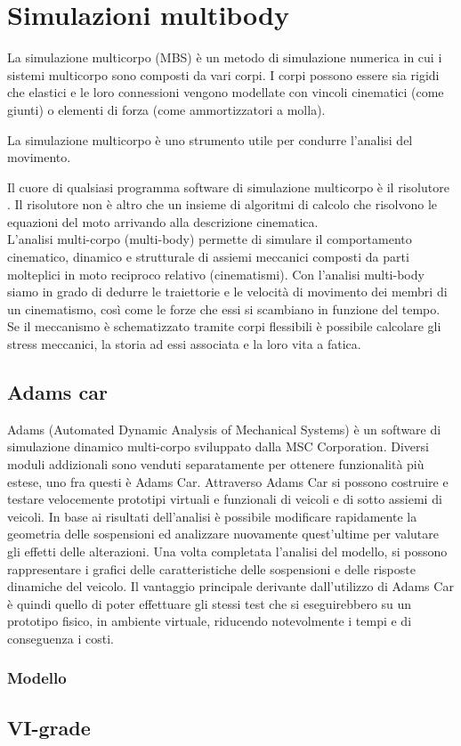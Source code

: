 \chapter{Simulazioni multibody}
\label{cha:cap5}
La simulazione multicorpo (MBS) è un metodo di simulazione numerica in cui i sistemi multicorpo sono composti da vari corpi. I corpi possono essere sia rigidi che elastici e le loro connessioni vengono modellate con vincoli cinematici (come giunti) o elementi di forza (come ammortizzatori a molla).

La simulazione multicorpo è uno strumento utile per condurre l'analisi del movimento.

Il cuore di qualsiasi programma software di 
simulazione multicorpo è il risolutore .
Il risolutore non è altro che un insieme di 
algoritmi di calcolo che risolvono le equazioni del moto arrivando alla descrizione cinematica.\\
L’analisi multi-corpo (multi-body) permette di simulare il comportamento 
cinematico, dinamico e strutturale di assiemi meccanici composti da parti 
molteplici in moto reciproco relativo (cinematismi).
Con l’analisi multi-body siamo in grado di dedurre le traiettorie e le 
velocità di movimento dei membri di un cinematismo, così come le forze che 
essi si scambiano in funzione del tempo.
Se il meccanismo è schematizzato tramite corpi flessibili è possibile 
calcolare gli stress meccanici, la storia ad essi associata e la loro vita 
a fatica.

\section{Adams car}
Adams (Automated Dynamic Analysis of Mechanical Systems) è un software di simulazione
dinamico multi-corpo sviluppato dalla MSC Corporation. Diversi moduli addizionali sono
venduti separatamente per ottenere funzionalità più estese, uno fra questi è Adams Car.
Attraverso Adams Car si possono costruire e testare velocemente prototipi virtuali e funzionali
di veicoli e di sotto assiemi di veicoli.
In base ai risultati dell'analisi è possibile modificare rapidamente la geometria delle sospensioni
ed analizzare nuovamente quest’ultime per valutare gli effetti delle alterazioni.
Una volta completata l'analisi del modello, si possono rappresentare i grafici delle
caratteristiche delle sospensioni e delle risposte dinamiche del veicolo.
Il vantaggio principale derivante dall’utilizzo di Adams Car è quindi quello di poter effettuare
gli stessi test che si eseguirebbero su un prototipo fisico, in ambiente virtuale, riducendo
notevolmente i tempi e di conseguenza i costi.
\subsection{Modello}

\section{VI-grade}